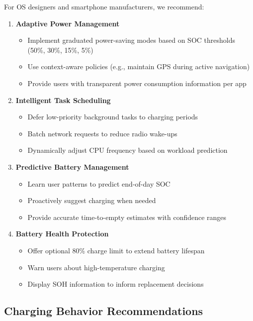 For OS designers and smartphone manufacturers, we recommend:

\begin{enumerate}
    \item \textbf{Adaptive Power Management}
    \begin{itemize}
        \item Implement graduated power-saving modes based on SOC thresholds (50\%, 30\%, 15\%, 5\%)
        \item Use context-aware policies (e.g., maintain GPS during active navigation)
        \item Provide users with transparent power consumption information per app
    \end{itemize}
    
    \item \textbf{Intelligent Task Scheduling}
    \begin{itemize}
        \item Defer low-priority background tasks to charging periods
        \item Batch network requests to reduce radio wake-ups
        \item Dynamically adjust CPU frequency based on workload prediction
    \end{itemize}
    
    \item \textbf{Predictive Battery Management}
    \begin{itemize}
        \item Learn user patterns to predict end-of-day SOC
        \item Proactively suggest charging when needed
        \item Provide accurate time-to-empty estimates with confidence ranges
    \end{itemize}
    
    \item \textbf{Battery Health Protection}
    \begin{itemize}
        \item Offer optional 80\% charge limit to extend battery lifespan
        \item Warn users about high-temperature charging
        \item Display SOH information to inform replacement decisions
    \end{itemize}
\end{enumerate}

\subsection{Charging Behavior Recommendations}
\label{subsec:charging_recommendations}

